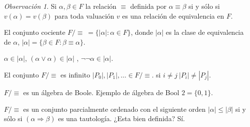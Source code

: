 \documentclass[a4paper,11pt]{article}
\theoremstyle{definition}
\theoremstyle{remark}
\newtheorem*{remk}{Observación}
\begin{document}
\begin{remk}
Si $\alpha, \beta \in F$ la relación $\equiv$ definida por $\alpha \equiv \beta$ si y sólo si
$v(\alpha) = v(\beta)$ para toda valuación $v$ es una relación de equivalencia en $F$.

El conjunto cociente $F/\equiv\ = \{ |\alpha| : \alpha \in F \}$, donde $|\alpha|$ es la clase
de equivalencia de $\alpha$, $|\alpha| = \{ \beta \in F : \beta \equiv \alpha \}$.

$\alpha \in |\alpha|$, $(\alpha \vee \alpha) \in |\alpha|$ , $\neg \neg \alpha \in |\alpha|$.
\end{remk}

El conjunto $F / \equiv$ es infinito $|P_0|, |P_1|, \dots \in F/\equiv$. si $i \neq j\ |P_i| \neq |P_j|$.

$F / \equiv$ es un álgebra de Boole. Ejemplo de álgebra de Bool $2 = \{0, 1\}$.

$F / \equiv$ es un conjunto parcialmente ordenado con el siguiente orden 
$|\alpha| \leq |\beta|$ si y sólo si $(\alpha \Rightarrow \beta)$ es una tautología.
¿Esta bien definida? Sí.
\end{document}
